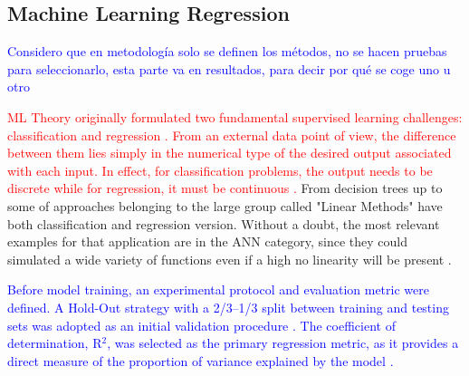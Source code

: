 \documentclass[review]{elsarticle}
\begin{document}
\subsection{Machine Learning Regression}\label{Machine Learning Regression}
\textcolor{blue}{Considero que en metodología solo se definen los métodos, no se hacen pruebas para seleccionarlo, esta parte va en resultados, para decir por qué se coge uno u otro}

\textcolor{red}{ML Theory originally formulated two fundamental supervised learning challenges: classification and regression \cite{hastie2009elements, bishop2006}.  From an external data point of view, the difference between them lies simply in the numerical type of the desired output associated with each input. In effect, for classification problems, the output needs to be discrete while for regression, it must be continuous \cite{mitchell97}.}  From decision trees up to some of approaches belonging to the large group called "Linear Methods" have both classification and regression version. Without a doubt, the most relevant examples for that application are in the ANN category, since they could simulated a wide variety of functions  even if a high no linearity will be present \cite{witten2011data}.

\textcolor{blue}{Before model training, an experimental protocol and evaluation metric were defined. A Hold-Out strategy with a 2/3–1/3 split between training and testing sets was adopted as an initial validation procedure \cite{hastie2009elements}. The coefficient of determination, R$^2$, was selected as the primary regression metric, as it provides a direct measure of the proportion of variance explained by the model \cite{james2021}.}
\end{document}
